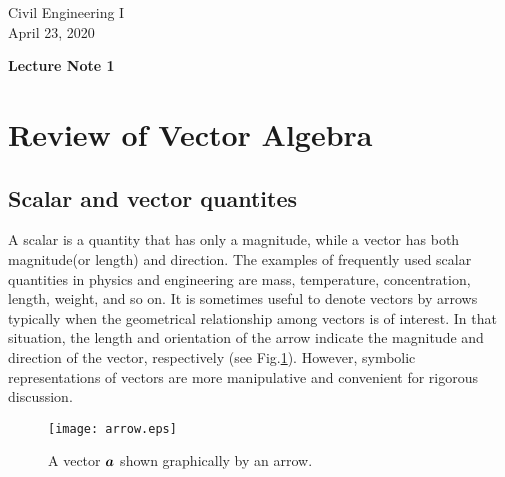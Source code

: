 \documentclass[10pt,a4j]{article}
\newlength{\minitwocolumn}
\begin{document}
\newcommand{\fat}[1]{\mbox{\boldmath $#1$}}
\newcommand{\D}{\partial}
\newcommand{\w}{\omega}
\newcommand{\ga}{\alpha}
\newcommand{\gb}{\beta}
\newcommand{\gx}{\xi}
\newcommand{\gz}{\zeta}
\newcommand{\vhat}[1]{\hat{\fat{#1}}}
\newcommand{\spc}{\vspace{0.7\baselineskip}}
\newcommand{\halfspc}{\vspace{0.3\baselineskip}}

\newcommand{\twofig}[2]
 {
   \begin{figure}
     \begin{minipage}[t]{\minitwocolumn}
         \begin{center}   #1
         \end{center}
     \end{minipage}
         \hspace{\columnsep}
     \begin{minipage}[t]{\minitwocolumn}
         \begin{center} #2
         \end{center}
     \end{minipage}
   \end{figure}
 }
\begin{flushright}
	Civil Engineering I\\
	April 23, 2020
\end{flushright}
\begin{center}
	{\Large \bf Lecture Note 1}
\end{center}
\section{Review of Vector Algebra}
\subsection{Scalar and vector quantites}
A scalar is a quantity that has only a magnitude, while a vector has both magnitude(or length) and direction. The examples of frequently used scalar quantities in physics and engineering are mass, temperature, concentration, length, weight, and so on. It is sometimes useful to denote vectors by arrows typically when the geometrical relationship among vectors is of interest. In that situation, the length and orientation of the arrow indicate the magnitude and direction of the vector, respectively (see Fig.\ref{fig:fig1}). However, symbolic representations of vectors are more manipulative and convenient for rigorous discussion. 
\begin{figure}[h]
	\begin{center}
	\texttt{[image: arrow.eps]} 
	\end{center}
	\caption{A vector $\fat{a}$ shown graphically by an arrow.} 
	\label{fig:fig1}
\end{figure}
\end{document}
